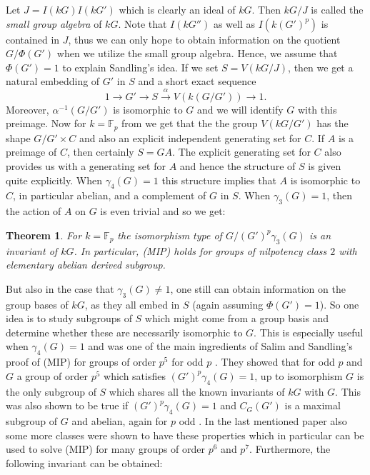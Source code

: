 \documentclass[11pt, a4paper]{amsart}
\newtheorem{theorem}{Theorem}[section]
\theoremstyle{definition}
\begin{document}
Let $J = I(kG)I(kG')$ which is clearly an ideal of $kG$. Then $kG/J$ is called the \emph{small group algebra} of $kG$. Note that $I(kG'')$ as well as $I(k(G')^p)$ is contained in $J$, thus we can only hope to obtain information on the quotient $G/\Phi(G')$ when we utilize the small group algebra. Hence, we assume that $\Phi(G') = 1$ to explain Sandling's idea. If we set $S = V(kG/J)$, then we get a natural embedding of $G'$ in $S$ and a short exact sequence
\[ 1 \longrightarrow G' \longrightarrow S\overset{\alpha}{\longrightarrow} V(k(G/G') )\longrightarrow 1.\]
Moreover, $\alpha^{-1}(G/G')$ is isomorphic to $G$ and we will identify $G$ with this preimage. Now for $k = \mathbb{F}_p$ from \cite{Sandling84} we get that the the group $V(kG/G')$ has the shape $G/G' \times C$ and also an explicit independent generating set for $C$. If $A$ is a preimage of $C$, then certainly $S = GA$. The explicit generating set for $C$ also provides us with a generating set for $A$ and hence the structure of $S$ is given quite explicitly. When $\gamma_4(G) = 1$ this structure implies that $A$ is isomorphic to $C$, in particular abelian, and a complement of $G$ in $S$. When $\gamma_3(G)=1$, then the action of $A$ on $G$ is even trivial and so we get:

\begin{theorem}\label{th:Sandling89} \cite{Sandling89}
For $k = \mathbb{F}_p$ the isomorphism type of $G/(G')^p\gamma_3(G)$ is an invariant of $kG$. In particular, (MIP) holds for groups of nilpotency class $2$ with elementary abelian derived subgroup.
\end{theorem} 

But also in the case that $\gamma_3(G) \neq 1$, one still can obtain information on the group bases of $kG$, as they all embed in $S$ (again assuming $\Phi(G') = 1$). So one idea is to study subgroups of $S$ which might come from a group basis and determine whether these are necessarily isomorphic to $G$. This is especially useful when $\gamma_4(G) = 1$ and was one of the main ingredients of Salim and Sandling's proof of (MIP) for groups of order $p^5$ for odd $p$ \cite{SalimSandlingp5}. They showed that for odd $p$ and $G$ a group of order $p^5$ which satisfies $(G')^p\gamma_4(G) = 1$, up to isomorphism $G$ is the only subgroup of $S$ which shares all the known invariants of $kG$ with $G$. This was also shown to be true if $(G')^p\gamma_4(G) = 1$ and $C_G(G')$ is a maximal subgroup of $G$ and abelian, again for $p$ odd \cite{MargolisStanojkovski21}. In the last mentioned paper also some more classes were shown to have these properties which in particular can be used to solve (MIP) for many groups of order $p^6$ and $p^7$. Furthermore, the following invariant can be obtained:
\end{document}
